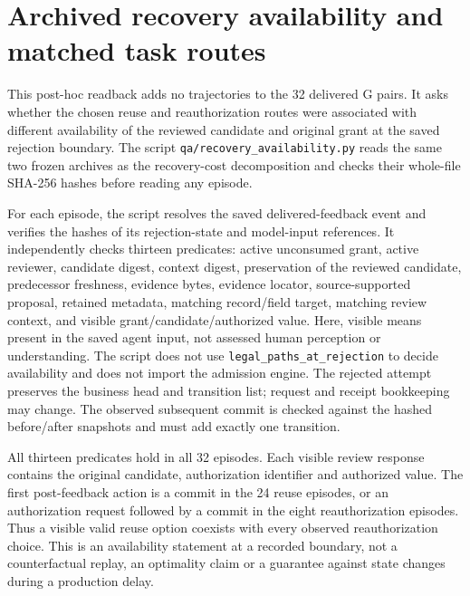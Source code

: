 \section{Archived recovery availability and matched task routes}
\label{sec:a12-availability}

This post-hoc readback adds no trajectories to the 32 delivered G pairs. It asks
whether the chosen reuse and reauthorization routes were associated with
different availability of the reviewed candidate and original grant at the
saved rejection boundary. The script \texttt{qa/recovery\_availability.py}
reads the same two frozen archives as the recovery-cost decomposition and
checks their whole-file SHA-256 hashes before reading any episode.

For each episode, the script resolves the saved delivered-feedback event and
verifies the hashes of its rejection-state and model-input references. It
independently checks thirteen predicates: active unconsumed grant, active
reviewer, candidate digest, context digest, preservation of the reviewed
candidate, predecessor freshness, evidence bytes, evidence locator,
source-supported proposal, retained metadata, matching record/field target,
matching review context, and visible grant/candidate/authorized value.
Here, visible means present in the saved agent input, not assessed human
perception or understanding. The script does not use \texttt{legal\_paths\_at\_rejection} to decide availability and
does not import the admission engine. The rejected attempt preserves the
business head and transition list; request and receipt bookkeeping may change.
The observed subsequent commit is checked against the hashed before/after
snapshots and must add exactly one transition.

All thirteen predicates hold in all 32 episodes. Each visible review response
contains the original candidate, authorization identifier and authorized
value. The first post-feedback action is a commit in the 24 reuse episodes,
or an authorization request followed by a commit in the eight reauthorization
episodes. Thus a visible valid reuse option coexists with every observed
reauthorization choice. This is an availability statement at a recorded
boundary, not a counterfactual replay, an optimality claim or a guarantee
against state changes during a production delay.

